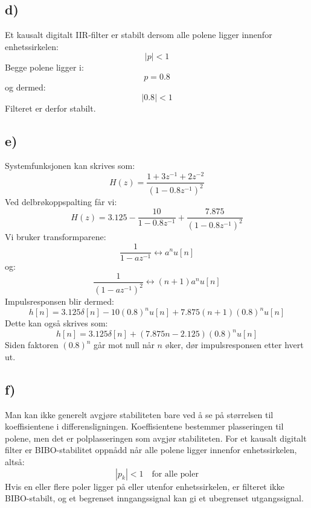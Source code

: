 \subsection*{d)}
Et kausalt digitalt IIR-filter er stabilt dersom alle polene
ligger innenfor enhetssirkelen:
\[
|p|<1
\]
Begge polene ligger i:
\[
p=0.8
\]
og dermed:
\[
|0.8|<1
\]
Filteret er derfor stabilt.
\subsection*{e)}
Systemfunksjonen kan skrives som:
\[
H(z)
=
\frac{1+3z^{-1}+2z^{-2}}
{(1-0.8z^{-1})^2}
\]
Ved delbrøkoppspalting får vi:
\[
H(z)
=
3.125
-
\frac{10}{1-0.8z^{-1}}
+
\frac{7.875}{(1-0.8z^{-1})^2}
\]
Vi bruker transformparene:
\[
\frac{1}{1-az^{-1}}
\longleftrightarrow
a^n u[n]
\]
og:
\[
\frac{1}{(1-az^{-1})^2}
\longleftrightarrow
(n+1)a^n u[n]
\]
Impulsresponsen blir dermed:
\[
h[n]
=
3.125\delta[n]
-
10(0.8)^n u[n]
+
7.875(n+1)(0.8)^n u[n]
\]
Dette kan også skrives som:
\[
\boxed{
h[n]
=
3.125\delta[n]
+
(7.875n-2.125)(0.8)^n u[n]
}
\]
Siden faktoren $(0.8)^n$ går mot null når $n$ øker, dør
impulsresponsen etter hvert ut.


\subsection*{f)}
Man kan ikke generelt avgjøre stabiliteten bare ved å se på
størrelsen til koeffisientene i differensligningen.
Koeffisientene bestemmer plasseringen til polene, men det er
polplasseringen som avgjør stabiliteten.
For et kausalt digitalt filter er BIBO-stabilitet oppnådd når alle polene ligger innenfor enhetssirkelen, altså:
\[
\boxed{
|p_k|<1
\quad
\text{for alle poler}
}
\]
Hvis en eller flere poler ligger på eller utenfor enhetssirkelen, er filteret ikke BIBO-stabilt, og et begrenset inngangssignal kan gi et ubegrenset utgangssignal.